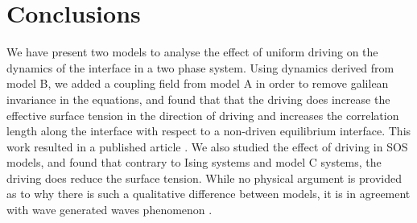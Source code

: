     \section{Conclusions}

We have present two models to analyse the effect of uniform driving on the dynamics of the interface in a two phase system. Using dynamics derived from model B\cite{bray_interface_2001,bray_interface_2001-1}, we added a coupling field from model A in order to remove galilean invariance in the equations, and found that that the driving does increase the effective surface tension in the direction of driving and increases the correlation length along the interface with respect to a non-driven equilibrium interface. This work resulted in a published article \cite{dean_effect_2020}.
We also studied the effect of driving in SOS models, and found that contrary to Ising systems \cite{smith_interfaces_2008-1} and model C systems, the driving does reduce the surface tension. While no physical argument is provided as to why there is such a qualitative difference between models, it is in agreement with wave generated waves phenomenon \cite{maat_roughness_1991}.